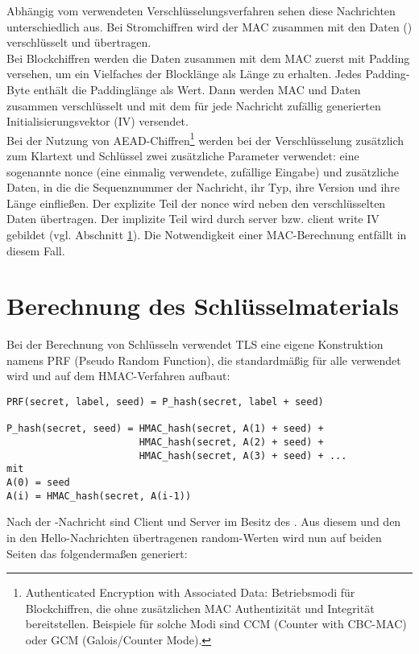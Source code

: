 Abhängig vom verwendeten Verschlüsselungsverfahren sehen diese Nachrichten unterschiedlich aus. Bei Stromchiffren wird der MAC zusammen mit den Daten () verschlüsselt und übertragen. \\
Bei Blockchiffren werden die Daten zusammen mit dem MAC zuerst mit Padding versehen, um ein Vielfaches der Blocklänge als Länge zu erhalten. Jedes Padding-Byte enthält die Paddinglänge als Wert. Dann werden MAC und Daten zusammen verschlüsselt und mit dem für jede Nachricht zufällig generierten Initialisierungsvektor (IV) versendet.\\
Bei der Nutzung von AEAD-Chiffren\footnote{Authenticated Encryption with Associated Data: Betriebsmodi für Blockchiffren, die ohne zusätzlichen MAC Authentizität und Integrität bereitstellen. Beispiele für solche Modi sind CCM (Counter with CBC-MAC) oder GCM (Galois/Counter Mode).} werden bei der Verschlüsselung zusätzlich zum Klartext und Schlüssel zwei zusätzliche Parameter verwendet: eine sogenannte nonce (eine einmalig verwendete, zufällige Eingabe) und zusätzliche Daten, in die die Sequenznummer der Nachricht, ihr Typ, ihre Version und ihre Länge einfließen. Der explizite Teil der nonce wird neben den verschlüsselten Daten übertragen. Der implizite Teil wird durch server bzw. client write IV gebildet (vgl. Abschnitt \ref{sec_key_material}). Die Notwendigkeit einer MAC-Berechnung entfällt in diesem Fall.


\section{Berechnung des Schlüsselmaterials}
\label{sec_key_material}

Bei der Berechnung von Schlüsseln verwendet TLS eine eigene Konstruktion namens PRF (Pseudo Random Function), die standardmäßig für alle \ciphersuites{} verwendet wird und auf dem HMAC-Verfahren aufbaut:

\begin{lstlisting}
PRF(secret, label, seed) = P_hash(secret, label + seed)

P_hash(secret, seed) = HMAC_hash(secret, A(1) + seed) +
					   HMAC_hash(secret, A(2) + seed) +
					   HMAC_hash(secret, A(3) + seed) + ...
mit
A(0) = seed
A(i) = HMAC_hash(secret, A(i-1))
\end{lstlisting}

Nach der \clientkeyexchange{}-Nachricht sind Client und Server im Besitz des \premastersecret{}. Aus diesem und den in den Hello-Nachrichten übertragenen random-Werten wird nun auf beiden Seiten das \mastersecret{} folgendermaßen generiert:

